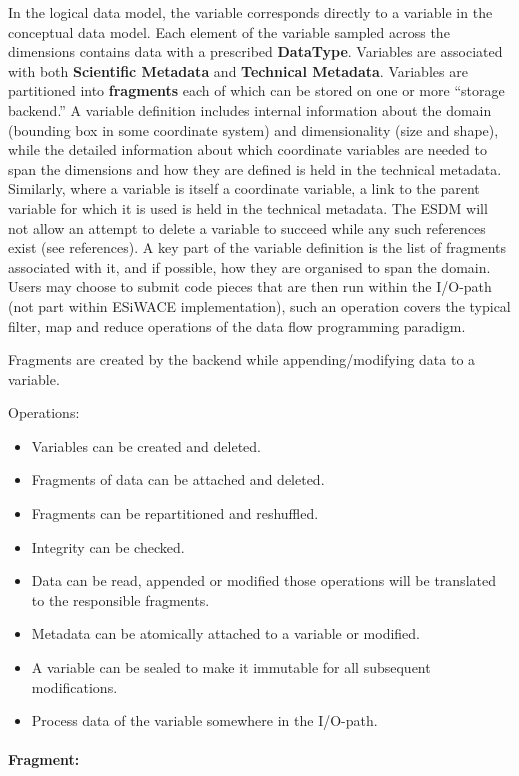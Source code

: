 In the logical data model, the variable corresponds directly to a
variable in the conceptual data model. Each element of the variable
sampled across the dimensions contains data with a prescribed
\textbf{DataType}. Variables are associated with both \textbf{Scientific
Metadata} and \textbf{Technical Metadata}. Variables are partitioned
into \textbf{fragments} each of which can be stored on one or more
``storage backend.'' A variable definition includes internal information
about the domain (bounding box in some coordinate system) and
dimensionality (size and shape), while the detailed information about
which coordinate variables are needed to span the dimensions and how
they are defined is held in the technical metadata. Similarly, where a
variable is itself a coordinate variable, a link to the parent variable
for which it is used is held in the technical metadata. The ESDM will
not allow an attempt to delete a variable to succeed while any such
references exist (see references). A key part of the variable definition
is the list of fragments associated with it, and if possible, how they
are organised to span the domain. Users may choose to submit code pieces
that are then run within the I/O-path (not part within ESiWACE
implementation), such an operation covers the typical filter, map and
reduce operations of the data flow programming paradigm.

Fragments are created by the backend while appending/modifying data to a
variable.

Operations:

\begin{itemize}
  \item Variables can be created and deleted.
  \item Fragments of data can be attached and deleted.
  \item Fragments can be repartitioned and reshuffled.
  \item Integrity can be checked.
  \item Data can be read, appended or modified those operations will be translated to the responsible fragments.
  \item Metadata can be atomically attached to a variable or modified.
  \item A variable can be sealed to make it immutable for all subsequent modifications.
  \item Process data of the variable somewhere in the I/O-path.
\end{itemize}

\paragraph{Fragment:}%
\label{fragment}

